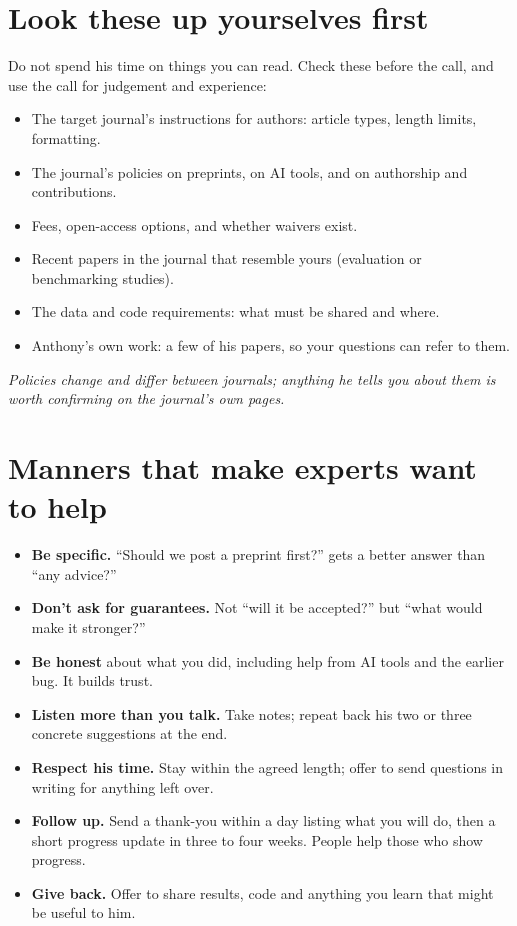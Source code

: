 \documentclass[10.5pt]{article}
\begin{document}
\section{Look these up yourselves first}
Do not spend his time on things you can read. Check these before the call, and use the call for judgement and
experience:
\begin{itemize}
\item[$\square$] The target journal's instructions for authors: article types, length limits, formatting.
\item[$\square$] The journal's policies on preprints, on AI tools, and on authorship and contributions.
\item[$\square$] Fees, open-access options, and whether waivers exist.
\item[$\square$] Recent papers in the journal that resemble yours (evaluation or benchmarking studies).
\item[$\square$] The data and code requirements: what must be shared and where.
\item[$\square$] Anthony's own work: a few of his papers, so your questions can refer to them.
\end{itemize}
\textit{Policies change and differ between journals; anything he tells you about them is worth confirming on the
journal's own pages.}

\section{Manners that make experts want to help}
\begin{itemize}
\item \textbf{Be specific.} ``Should we post a preprint first?'' gets a better answer than ``any advice?''
\item \textbf{Don't ask for guarantees.} Not ``will it be accepted?'' but ``what would make it stronger?''
\item \textbf{Be honest} about what you did, including help from AI tools and the earlier bug. It builds trust.
\item \textbf{Listen more than you talk.} Take notes; repeat back his two or three concrete suggestions at the end.
\item \textbf{Respect his time.} Stay within the agreed length; offer to send questions in writing for anything left over.
\item \textbf{Follow up.} Send a thank-you within a day listing what you will do, then a short progress update in three to four weeks. People help those who show progress.
\item \textbf{Give back.} Offer to share results, code and anything you learn that might be useful to him.
\end{itemize}

\vspace{6pt}
\begin{callout}[title={\textbf{Notes from the call}}]
\vspace{60pt}
\end{callout}
\end{document}
